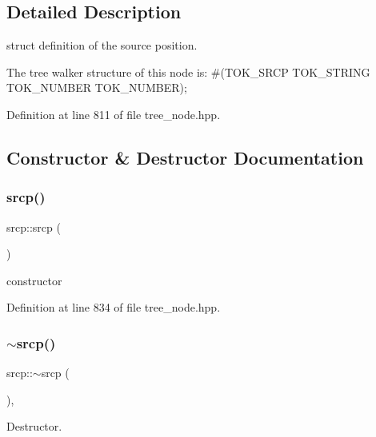\subsection{Detailed Description}
struct definition of the source position. 

The tree walker structure of this node is\+: \#(T\+O\+K\+\_\+\+S\+R\+CP T\+O\+K\+\_\+\+S\+T\+R\+I\+NG T\+O\+K\+\_\+\+N\+U\+M\+B\+ER T\+O\+K\+\_\+\+N\+U\+M\+B\+ER); 

Definition at line 811 of file tree\+\_\+node.\+hpp.



\subsection{Constructor \& Destructor Documentation}
\mbox{\label{structsrcp_acd3710ed7dc7212d9c362db1fd361f81}} 
\subsubsection{\texorpdfstring{srcp()}{srcp()}}
{\footnotesize\ttfamily srcp\+::srcp (\begin{DoxyParamCaption}{ }\end{DoxyParamCaption})\hspace{0.3cm}{\ttfamily [inline]}}



constructor 



Definition at line 834 of file tree\+\_\+node.\+hpp.

\mbox{\label{structsrcp_aa5ff584515aeb30cda33c01f58b2a02f}} 
\subsubsection{\texorpdfstring{$\sim$srcp()}{~srcp()}}
{\footnotesize\ttfamily srcp\+::$\sim$srcp (\begin{DoxyParamCaption}{ }\end{DoxyParamCaption})\hspace{0.3cm}{\ttfamily [virtual]}, {\ttfamily [default]}}



Destructor. 



